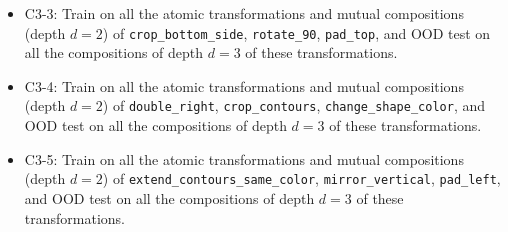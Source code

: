 \begin{itemize}
\begin{itemize}
        \item C3-3: Train on all the atomic transformations and mutual compositions (depth $d=2$) of \texttt{crop\_bottom\_side}, \texttt{rotate\_90}, \texttt{pad\_top}, and OOD test on all the compositions of depth $d=3$ of these transformations.

        \item C3-4: Train on all the atomic transformations and mutual compositions (depth $d=2$) of \texttt{double\_right}, \texttt{crop\_contours}, \texttt{change\_shape\_color}, and OOD test on all the compositions of depth $d=3$ of these transformations.    
        
        \item C3-5: Train on all the atomic transformations and mutual compositions (depth $d=2$) of \texttt{extend\_contours\_same\_color}, \texttt{mirror\_vertical}, \texttt{pad\_left}, and OOD test on all the compositions of depth $d=3$ of these transformations.
    \end{itemize} 

    \vspace{1em}
    
    
       
       

\end{itemize}
